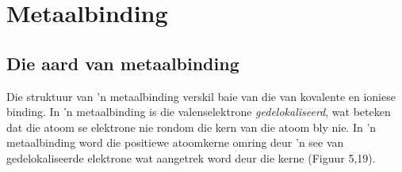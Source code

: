   \label{m38684**end}
         \section{Metaalbinding}
    \nopagebreak


            \subsection*{Die aard van metaalbinding}
            \nopagebreak
Die struktuur van 'n metaalbinding verskil baie van die van kovalente en ioniese binding. In 'n metaalbinding is die valenselektrone \textsl{gedelokaliseerd}, wat beteken dat die atoom se elektrone nie rondom die kern van die atoom bly nie. In 'n metaalbinding word die positiewe atoomkerne omring deur 'n see van gedelokaliseerde elektrone wat aangetrek word deur die kerne (Figuur 5,19).\\ 


